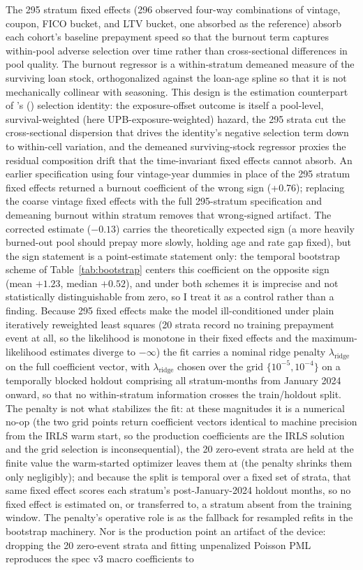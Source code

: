 \documentclass[12pt]{article}
\newcommand{\citepos}[1]{\citeauthor{#1}'s (\citeyear{#1})}
\begin{document}
The 295 stratum fixed effects (296 observed four-way combinations of vintage, coupon, FICO bucket, and LTV bucket, one absorbed as the reference) absorb each cohort's baseline prepayment speed so that the burnout term captures within-pool adverse selection over time rather than cross-sectional differences in pool quality. The burnout regressor is a within-stratum demeaned measure of the surviving loan stock, orthogonalized against the loan-age spline so that it is not mechanically collinear with seasoning. This design is the estimation counterpart of \citepos{lesniewski2026} selection identity: the exposure-offset outcome is itself a pool-level, survival-weighted (here UPB-exposure-weighted) hazard, the 295 strata cut the cross-sectional dispersion that drives the identity's negative selection term down to within-cell variation, and the demeaned surviving-stock regressor proxies the residual composition drift that the time-invariant fixed effects cannot absorb. An earlier specification using four vintage-year dummies in place of the 295 stratum fixed effects returned a burnout coefficient of the wrong sign (+0.76); replacing the coarse vintage fixed effects with the full 295-stratum specification and demeaning burnout within stratum removes that wrong-signed artifact. The corrected estimate ($-0.13$) carries the theoretically expected sign (a more heavily burned-out pool should prepay more slowly, holding age and rate gap fixed), but the sign statement is a point-estimate statement only: the temporal bootstrap scheme of Table~\ref{tab:bootstrap} centers this coefficient on the opposite sign (mean $+1.23$, median $+0.52$), and under both schemes it is imprecise and not statistically distinguishable from zero, so I treat it as a control rather than a finding. Because 295 fixed effects make the model ill-conditioned under plain iteratively reweighted least squares (20 strata record no training prepayment event at all, so the likelihood is monotone in their fixed effects and the maximum-likelihood estimates diverge to $-\infty$) the fit carries a nominal ridge penalty $\lambda_{\mathrm{ridge}}$ on the full coefficient vector, with $\lambda_{\mathrm{ridge}}$ chosen over the grid $\{10^{-5}, 10^{-4}\}$ on a temporally blocked holdout comprising all stratum-months from January 2024 onward, so that no within-stratum information crosses the train/holdout split. The penalty is not what stabilizes the fit: at these magnitudes it is a numerical no-op (the two grid points return coefficient vectors identical to machine precision from the IRLS warm start, so the production coefficients are the IRLS solution and the grid selection is inconsequential), the 20 zero-event strata are held at the finite value the warm-started optimizer leaves them at (the penalty shrinks them only negligibly); and because the split is temporal over a fixed set of strata, that same fixed effect scores each stratum's post-January-2024 holdout months, so no fixed effect is estimated on, or transferred to, a stratum absent from the training window. The penalty's operative role is as the fallback for resampled refits in the bootstrap machinery. Nor is the production point an artifact of the device: dropping the 20 zero-event strata and fitting unpenalized Poisson PML reproduces the spec v3 macro coefficients to 
\end{document}
